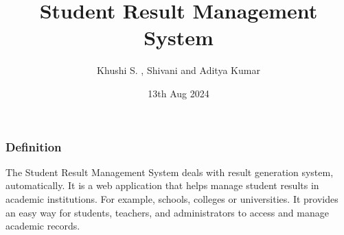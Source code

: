\documentclass{beamer}
\title{Student Result Management System}
\author{Khushi S. , Shivani and Aditya Kumar}
\date{13th Aug 2024}
\begin{document}


\frame{\titlepage}

\begin{frame}
    \frametitle{Definition}
    The Student Result Management System deals with result generation system, automatically. It is a web application that helps manage student results in academic institutions. For example, schools, colleges  or universities.
    It provides an easy way for students, teachers, and administrators to access and manage academic records.
\end{frame}
\end{document}
